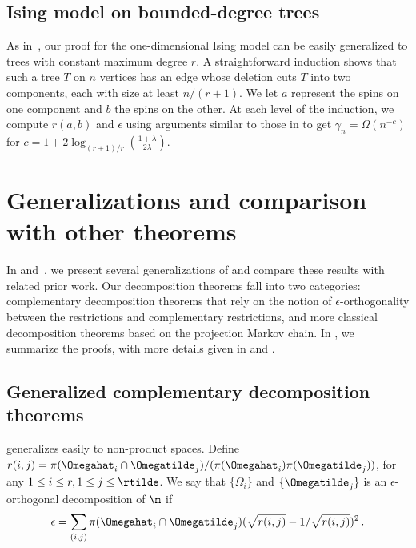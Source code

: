 %
\subsection{Ising model on bounded-degree trees}  %

As in~\cite{jstv04}, our proof for the one-dimensional Ising model can 
be easily generalized to trees with constant maximum degree $r$.  A 
straightforward induction shows that such a tree $T$ on $n$ vertices 
has an edge whose deletion cuts $T$ into two components, each with size 
at least $n/(r+1)$. We let $a$ represent the spins on one component and 
$b$ the spins on the other. At each level of the induction, we compute 
$r(a,b)$ and $\epsilon$ using arguments similar to those in 
 to get $\gamma_n = \Omega(n^{-c})$ for $c = 1 
+ 2\log_{(r+1)/r}\left(\frac{1+\lambda}{2\lambda}\right)$. 

\section{Generalizations and comparison with other theorems}\label{sec:generalizations}

In  and~, we present 
several generalizations of  and compare 
these results with related prior work.  Our decomposition theorems fall 
into two categories: complementary decomposition theorems that rely on 
the notion of $\epsilon$-orthogonality between the restrictions and 
complementary restrictions, and more classical decomposition theorems 
based on the projection Markov chain.  In , we 
summarize the proofs, with more details given in  and .

\subsection{Generalized complementary decomposition theorems}\label{sec:gencomp}

 generalizes easily to non-product spaces.  
Define $r(i,j)=\pi(\Omegahat_i\cap\Omegatilde_j)/(\pi(\Omegahat_i)\pi(\Omegatilde_j))$, 
for any $1\leq i\leq r, 1\leq j\leq \rtilde$.
We say that $\{\Omega_i\}$ and $\{\Omegatilde_j\}$
is an $\epsilon$-orthogonal decomposition of $\m$ if
\begin{equation*}
  \epsilon=  \sum_{(i,j)}\pi(\Omegahat_i\cap\Omegatilde_j)(\sqrt{r(i,j)}-1/\sqrt{r(i,j)})^2\,.
\end{equation*}

